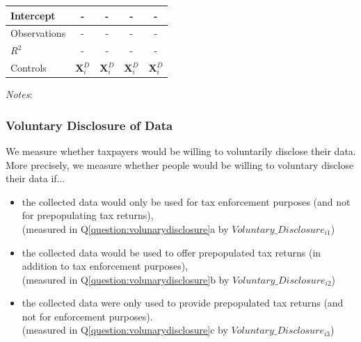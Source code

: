 \documentclass[11pt]{article}
\begin{document}
\begin{table}[!htbp]
\begin{threeparttable}
\begin{tabular}{l|cccc}
Intercept              & - & - & - & -\\
\midrule
Observations                        &- &- & - & -     \\
$R^2$                               &- &- & - & -  \\
Controls                 & $\mathbf{X}_{i}^{D}$  & $\mathbf{X}_{i}^{D}$ & $\mathbf{X}_{i}^{D}$  & $\mathbf{X}_{i}^{D}$    \\
\bottomrule
\end{tabular}
\begin{tablenotes}[flushleft]
\footnotesize
\item \textit{Notes}:   
\end{tablenotes}
\end{threeparttable}
\end{table} 
\FloatBarrier
\subsubsection{Voluntary Disclosure of Data}
We measure whether taxpayers would be willing to voluntarily disclose their data. More precisely, we measure whether people would be willing to voluntary disclose their data if...
\begin{itemize}
    \item the collected data would only be used for tax enforcement purposes (and not for prepopulating tax returns),\\
    (measured in Q\ref{question:volunarydisclosure}a by $Voluntary\_Disclosure_{i1}$)
    \item the collected data would be used to offer prepopulated tax returns (in addition to tax enforcement purposes), \\
    (measured in Q\ref{question:volunarydisclosure}b by $Voluntary\_Disclosure_{i2}$)
    \item the collected data were only used to provide prepopulated tax returns (and not for enforcement purposes).\\
    (measured in Q\ref{question:volunarydisclosure}c by $Voluntary\_Disclosure_{i3}$)
\end{itemize}
\end{document}

